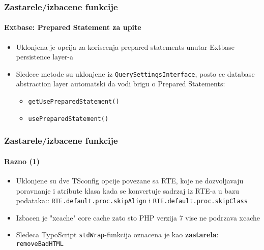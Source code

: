 \begin{frame}[fragile]
	\frametitle{Zastarele/izbacene funkcije}
	\framesubtitle{Extbase: Prepared Statement za upite}

	\begin{itemize}

		\item Uklonjena je opcija za koriscenja prepared statements unutar Extbase persistence layer-a

		\item Sledece metode su uklonjene iz \texttt{QuerySettingsInterface},
			posto ce database abstraction layer automatski da vodi brigu o Prepared Statements:

			\begin{itemize}
				\item \texttt{getUsePreparedStatement()}
				\item \texttt{usePreparedStatement()}
			\end{itemize}

	\end{itemize}

\end{frame}


\begin{frame}[fragile]
	\frametitle{Zastarele/izbacene funkcije}
	\framesubtitle{Razno (1)}

	\begin{itemize}

		\item Uklonjene su dve TSconfig opcije povezane sa RTE, koje ne dozvoljavaju poravnanje 
			i atribute klasa kada se konvertuje sadrzaj iz RTE-a u bazu podataka::\newline
			\small
				\texttt{RTE.default.proc.skipAlign} i \texttt{RTE.default.proc.skipClass}
			\normalsize

		\item Izbacen je "xcache" core cache zato sto PHP verzija 7 vise ne podrzava xcache

		\item Sledeca TypoScript \texttt{stdWrap}-funkcija oznacena je kao \textbf{zastarela}:
			\texttt{removeBadHTML}

	\end{itemize}

\end{frame}

